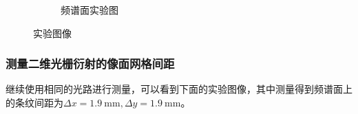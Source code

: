 \documentclass[a4paper]{article}
\begin{document}
\begin{figure}[H]
\begin{subfigure}[t]{0.3\textwidth}
        \caption{频谱面实验图}
        \label{fig3-4-6}
    \end{subfigure}
    \captionsetup{justification=centering,subrefformat=parens,margin=2cm,format=cont}
    \caption{实验图像}
\end{figure}


\subsubsection{测量二维光栅衍射的像面网格间距}
\hspace{2em} 继续使用相同的光路进行测量，可以看到下面的实验图像，其中测量得到频谱面上的条纹间距为$\Delta x=\SI{1.9}{\mm},\Delta y=\SI{1.9}{\mm}$。 \par
\end{document}
